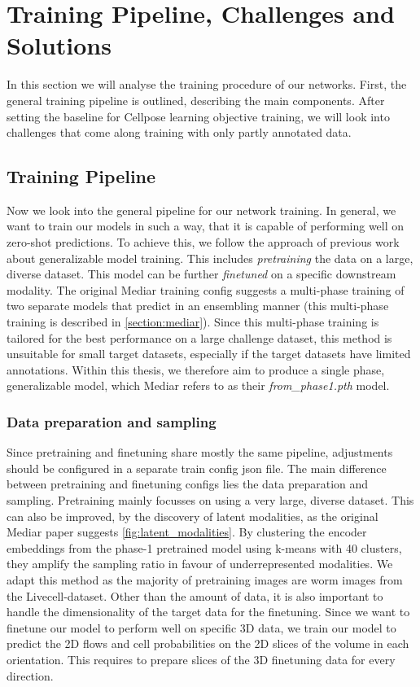 \section{Training Pipeline, Challenges and Solutions}
\label{training pipeline}
In this section we will analyse the training procedure of our networks. First, the general training pipeline is outlined, describing the main components. After setting the baseline for Cellpose learning objective training, we will look into challenges that come along training with only partly annotated data. 

\subsection{Training Pipeline}

Now we look into the general pipeline for our network training. In general, we want to train our models in such a way, that it is capable of performing well on zero-shot predictions. To achieve this, we follow the approach of previous work about generalizable model training. This includes \textit{pretraining} the data on a large, diverse dataset. This model can be further \textit{finetuned} on a specific downstream modality. The original Mediar training config suggests a multi-phase training of two separate models that predict in an ensembling manner (this multi-phase training is described in \ref{section:mediar}). Since this multi-phase training is tailored for the best performance on a large challenge dataset, this method is unsuitable for small target datasets, especially if the target datasets have limited annotations. Within this thesis, we therefore aim to produce a single phase, generalizable model, which Mediar refers to as their \textit{from\_phase1.pth} model.

\subsubsection{Data preparation and sampling}
Since pretraining and finetuning share mostly the same pipeline, adjustments should be configured in a separate train config json file. The main difference between pretraining and finetuning configs lies the data preparation and sampling. Pretraining mainly focusses on using a very large, diverse dataset. This can also be improved, by the discovery of latent modalities, as the original Mediar paper suggests \ref{fig:latent_modalities}. By clustering the encoder embeddings from the phase-1 pretrained model using k-means with 40 clusters, they amplify the sampling ratio in favour of underrepresented modalities. We adapt this method as the majority of pretraining images are worm images from the Livecell-dataset. Other than the amount of data, it is also important to handle the dimensionality of the target data for the finetuning. Since we want to finetune our model to perform well on specific 3D data, we train our model to predict the 2D flows and cell probabilities on the 2D slices of the volume in each orientation. This requires to prepare slices of the 3D finetuning data for every direction. 


